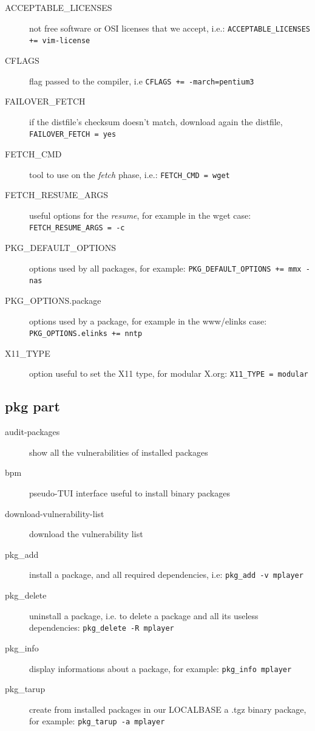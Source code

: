 \documentclass[notumble]{leaflet}
\begin{document}
\begin{description}
\item[ACCEPTABLE\_LICENSES] not free software or OSI licenses that we accept,
i.e.:
\verb|ACCEPTABLE_LICENSES += vim-license|
\item[CFLAGS] flag passed to the compiler, i.e
\verb|CFLAGS += -march=pentium3|
\item[FAILOVER\_FETCH] if the distfile's checksum doesn't match, download
again the distfile, \verb|FAILOVER_FETCH = yes|
\item[FETCH\_CMD] tool to use on the \emph{fetch} phase, i.e.:
\verb|FETCH_CMD = wget|
\item[FETCH\_RESUME\_ARGS] useful options for the \emph{resume}, for example
in the wget case: \verb|FETCH_RESUME_ARGS = -c|
\item[PKG\_DEFAULT\_OPTIONS] options used by all packages, for example:
\verb|PKG_DEFAULT_OPTIONS += mmx -nas|
\item[PKG\_OPTIONS.package] options used by a package, for example in the
\mbox{www/elinks} case: \verb|PKG_OPTIONS.elinks += nntp|
\item[X11\_TYPE] option useful to set the X11 type, for modular \mbox{X.org}:
\verb|X11_TYPE = modular|
\end{description}

\subsection{pkg part}
\begin{description}
\item[audit-packages] show all the vulnerabilities of installed packages
\item[bpm] pseudo-TUI interface useful to install binary packages
\item[download-vulnerability-list] download the vulnerability list
\item[pkg\_add] install a package, and all required dependencies, i.e:
\verb|pkg_add -v mplayer|
\item[pkg\_delete] uninstall a package, i.e. to delete a package and all its
useless dependencies: \verb|pkg_delete -R mplayer|
\item[pkg\_info] display informations about a package, for example:
\verb|pkg_info mplayer|
\item[pkg\_tarup] create from installed packages in our \mbox{LOCALBASE} a .tgz binary
package, for example: \verb|pkg_tarup -a mplayer|
\end{description}
\end{document}
